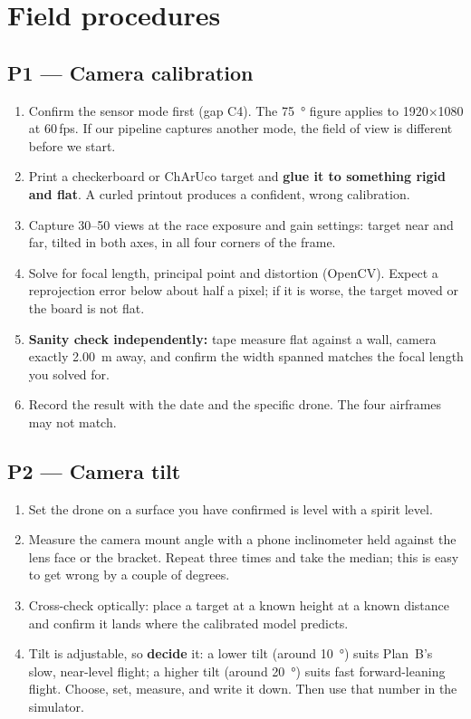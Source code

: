 \section{Field procedures}\label{sec:proc}

\subsection{P1 --- Camera calibration}
\begin{enumerate}
\item Confirm the sensor mode first (gap C4). The \SI{75}{\degree} figure applies to 1920$\times$1080
at 60\,fps. If our pipeline captures another mode, the field of view is different before we start.
\item Print a checkerboard or ChArUco target and \textbf{glue it to something rigid and flat}. A
curled printout produces a confident, wrong calibration.
\item Capture 30--50 views at the race exposure and gain settings: target near and far, tilted in
both axes, in all four corners of the frame.
\item Solve for focal length, principal point and distortion (OpenCV). Expect a reprojection error
below about half a pixel; if it is worse, the target moved or the board is not flat.
\item \textbf{Sanity check independently:} tape measure flat against a wall, camera exactly
\SI{2.00}{m} away, and confirm the width spanned matches the focal length you solved for.
\item Record the result with the date and the specific drone. The four airframes may not match.
\end{enumerate}

\subsection{P2 --- Camera tilt}
\begin{enumerate}
\item Set the drone on a surface you have confirmed is level with a spirit level.
\item Measure the camera mount angle with a phone inclinometer held against the lens face or the
bracket. Repeat three times and take the median; this is easy to get wrong by a couple of degrees.
\item Cross-check optically: place a target at a known height at a known distance and confirm it
lands where the calibrated model predicts.
\item Tilt is adjustable, so \textbf{decide} it: a lower tilt (around \SI{10}{\degree}) suits Plan~B's
slow, near-level flight; a higher tilt (around \SI{20}{\degree}) suits fast forward-leaning flight.
Choose, set, measure, and write it down. Then use that number in the simulator.
\end{enumerate}

